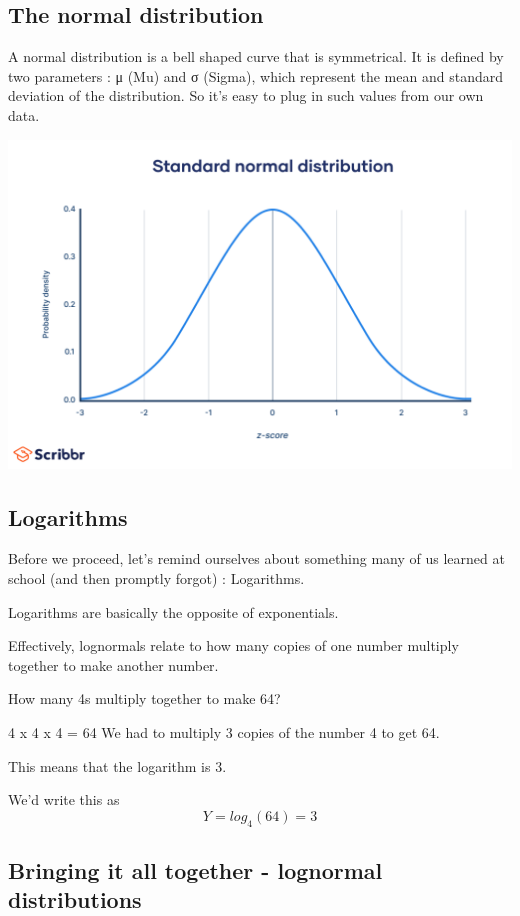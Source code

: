 \documentclass[
  letterpaper,
  DIV=11,
  numbers=noendperiod]{scrreprt}
\begin{document}
\subsection{The normal distribution}\label{the-normal-distribution}

A normal distribution is a bell shaped curve that is symmetrical. It is
defined by two parameters : μ (Mu) and σ (Sigma), which represent the
mean and standard deviation of the distribution. So it's easy to plug in
such values from our own data.

\includegraphics{images/normal_dist.png}

\subsection{Logarithms}\label{logarithms}

Before we proceed, let's remind ourselves about something many of us
learned at school (and then promptly forgot) : Logarithms.

Logarithms are basically the opposite of exponentials.

Effectively, lognormals relate to how many copies of one number multiply
together to make another number.

How many 4s multiply together to make 64?

4 x 4 x 4 = 64 We had to multiply 3 copies of the number 4 to get 64.

This means that the logarithm is 3.

We'd write this as \[
Y = log_4(64) = 3
\]

\subsection{Bringing it all together - lognormal
distributions}\label{bringing-it-all-together---lognormal-distributions}
\end{document}
